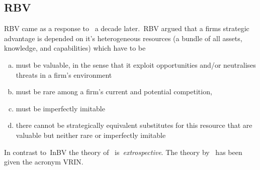 \subsection{\glsdesc{RBV}} %

\Gls{RBV} came as a response to~\cite{Porter:1980} a decade later.~\Gls{RBV} argued that a firms strategic advantage is depended on it's heterogeneous resources (a bundle of all assets, knowledge, and capabilities) which have to be
\begin{enumerate}[(a)]
\item must be valuable, in the sense that it exploit opportunities and/or neutralises threats in a firm’s environment
\item must be rare among a firm’s current and potential competition, 
\item must be imperfectly imitable
\item  there cannot be strategically equivalent substitutes for this resource that are valuable but neither rare or imperfectly imitable 
\end{enumerate} 
In contrast to~\gls{InBV} the theory of~\cite{Barney:1991} is~\emph{extrospective}. 
The theory by~\cite{Barney:1991}  has been given the acronym VRIN\@.\\
